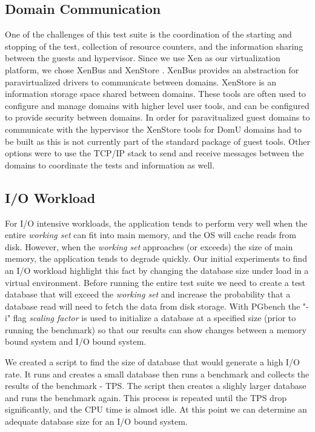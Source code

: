 \subsection{Domain Communication}
One of the challenges of this test suite is the coordination of the starting and stopping of the test, collection of resource counters, and the information sharing between the guests and hypervisor.  
Since we use Xen as our virtualization platform, we chose XenBus and XenStore \cite{xenbus}. 
XenBus provides an abstraction for paravirtualized drivers to communicate between domains.  
XenStore is an information storage space shared between domains.  
These tools are often used to configure and manage domains with higher level user tools, and can be configured to provide security between domains.
In order for paravitualized guest domains to communicate with the hypervisor the XenStore tools for DomU domains had to be built as this is not currently part of the standard package of guest tools.  Other options were to use the TCP/IP stack to send and receive messages between the domains to coordinate the tests and information as well.

\subsection{I/O Workload}
For I/O intensive workloads, the application tends to perform very well when the entire \emph{working set} can fit into main memory, and the OS will cache reads from disk.
However, when the \emph{working set}  approaches (or exceeds) the size of main memory, the application tends to degrade quickly.  
Our initial experiments to find an I/O workload highlight this fact by changing the database size under load in a virtual environment.
Before running the entire test suite we need to create a test database that will exceed the \emph{working set} and increase the probability that a database read will need to fetch the data from disk storage.  With PGbench the "-i" flag \emph{scaling factor} is used to initialize a database at a specified size (prior to running the benchmark) so that our results can show changes between a memory bound system and I/O bound system.  

We created a script to find the size of database that would generate a high I/O rate.  It runs and creates a small database then runs a benchmark and collects the results of the benchmark - TPS.  The script then creates a slighly larger database and runs the benchmark again.  This process is repeated until the TPS drop significantly, and the CPU time is almost idle.  At this point we can determine an adequate database size for an I/O bound system.

